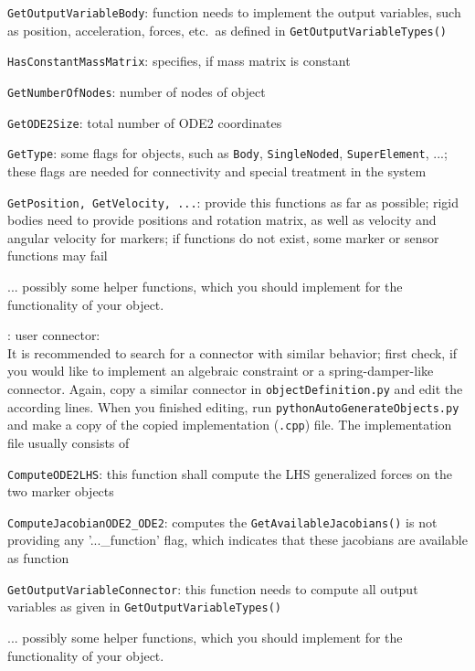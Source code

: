     \item \texttt{GetOutputVariableBody}: function needs to implement the output variables, such as position, acceleration, forces, etc.\ as defined in \texttt{GetOutputVariableTypes()}
    \item \texttt{HasConstantMassMatrix}: specifies, if mass matrix is constant
    \item \texttt{GetNumberOfNodes}: number of nodes of object
    \item \texttt{GetODE2Size}: total number of \ac{ODE2} coordinates
    \item \texttt{GetType}: some flags for objects, such as \texttt{Body}, \texttt{SingleNoded}, \texttt{SuperElement}, ...; these flags are needed for connectivity and special treatment in the system
    \item \texttt{GetPosition, GetVelocity, ...}: provide this functions as far as possible; rigid bodies need to provide positions and rotation matrix, as well as velocity and angular velocity for markers; if functions do not exist, some marker or sensor functions may fail
    \item ...   possibly some helper functions, which you should implement for the functionality of your object.
  \ei
  \item {}: user connector:\\
  It is recommended to search for a connector with similar behavior; first check, if you would like to implement 
  an algebraic constraint or a spring-damper-like connector.
  Again, copy a similar connector in \texttt{objectDefinition.py} and edit the according lines. 
  When you finished editing, run \texttt{pythonAutoGenerateObjects.py} and make a copy of the copied implementation (\texttt{.cpp}) file.
  The implementation file usually consists of
  \bi
    \item \texttt{ComputeODE2LHS}: this function shall compute the \ac{LHS} generalized forces on the two marker objects
    \item \texttt{ComputeJacobianODE2\_ODE2}: computes the \texttt{GetAvailableJacobians()} is not providing any '...\_function' flag, which indicates that these jacobians are available as function
    \item \texttt{GetOutputVariableConnector}: this function needs to compute all output variables as given in \texttt{GetOutputVariableTypes()}
    \item ...   possibly some helper functions, which you should implement for the functionality of your object.
  \ei
\ei




